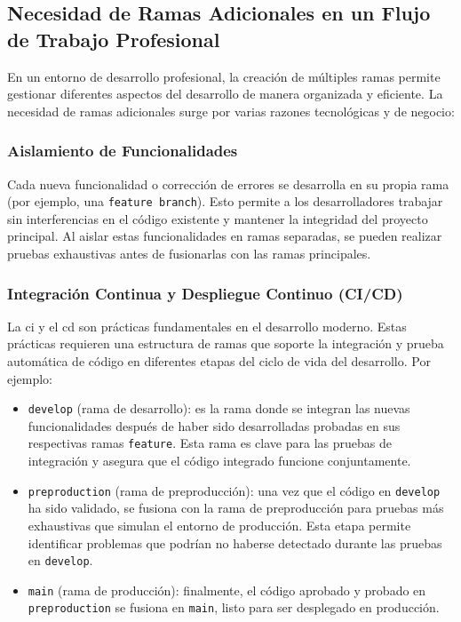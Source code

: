 \documentclass{template/uem_theme}
\begin{document}
\subsection{Necesidad de Ramas Adicionales en un Flujo de Trabajo Profesional}

En un entorno de desarrollo profesional, la creación de múltiples ramas permite gestionar diferentes aspectos del desarrollo de manera organizada y eficiente. La necesidad de ramas adicionales surge por varias razones tecnológicas y de negocio:

\subsubsection{Aislamiento de Funcionalidades}

Cada nueva funcionalidad o corrección de errores se desarrolla en su propia rama (por ejemplo, una \texttt{feature branch}). Esto permite a los desarrolladores trabajar sin interferencias en el código existente y mantener la integridad del proyecto principal. Al aislar estas funcionalidades en ramas separadas, se pueden realizar pruebas exhaustivas antes de fusionarlas con las ramas principales.

\subsubsection{Integración Continua y Despliegue Continuo (CI/CD)}

La \gls{ci} y el \gls{cd} son prácticas fundamentales en el desarrollo moderno. Estas prácticas requieren una estructura de ramas que soporte la integración y prueba automática de código en diferentes etapas del ciclo de vida del desarrollo. Por ejemplo:

\begin{itemize}
    \item \texttt{develop} (rama de desarrollo): es la rama donde se integran las nuevas funcionalidades después de haber sido desarrolladas probadas en sus respectivas ramas \texttt{feature}. Esta rama es clave para las pruebas de integración y asegura que el código integrado funcione conjuntamente.
    \item \texttt{preproduction} (rama de preproducción): una vez que el código en \texttt{develop} ha sido validado, se fusiona con la rama de preproducción para pruebas más exhaustivas que simulan el entorno de producción. Esta etapa permite identificar problemas que podrían no haberse detectado durante las pruebas en \texttt{develop}.
    \item \texttt{main} (rama de producción): finalmente, el código aprobado y probado en \texttt{preproduction} se fusiona en \texttt{main}, listo para ser desplegado en producción.
\end{itemize}
\end{document}
